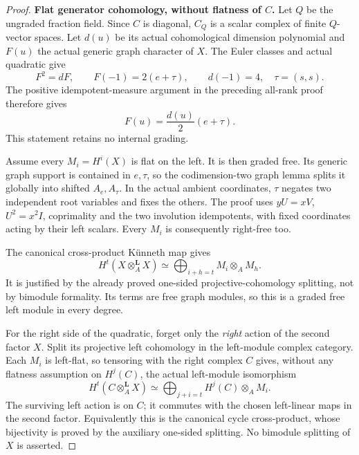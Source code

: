 \documentclass[11pt,a4paper]{article}
\theoremstyle{named}\newtheorem{finding}{Finding}[section]
\theoremstyle{definition}\newtheorem{definition}[finding]{Definition}
\theoremstyle{remark}\newtheorem{remark}[finding]{Remark}
\begin{document}
\begin{proof}
\par\smallskip\noindent\textbf{Flat generator cohomology, without flatness of \(C\).}\quad
Let \(Q\) be the ungraded fraction field.
Since \(C\) is diagonal, \(C_Q\) is a scalar
complex of finite \(Q\)-vector spaces.
Let \(d(u)\) be its actual cohomological
dimension polynomial and \(F(u)\) the actual
generic graph character of \(X\).
The Euler classes and actual quadratic give
\[
 F^2=dF,\qquad F(-1)=2(e+\tau),\qquad d(-1)=4,
                  \quad\tau=(s,s).
\]
The positive idempotent-measure argument in the
preceding all-rank proof therefore gives
\begin{equation}\label{eq:centralCoefficientGenericGraphs}
                      F(u)=\frac{d(u)}2(e+\tau).
\end{equation}
This statement retains no internal grading.

Assume every \(M_i=H^i(X)\) is flat on the left.
It is then graded free. Its generic graph support
is contained in \(e,\tau\), so the codimension-two
graph lemma splits it globally into shifted
\(A_e,A_\tau\). In the actual ambient coordinates,
\(\tau\) negates two independent root variables
and fixes the others. The proof uses
\(yU=xV\), \(U^2=x^2I\), coprimality and the
two involution idempotents, with fixed coordinates
acting by their left scalars.
Every \(M_i\) is consequently right-free too.

The canonical cross-product K\"unneth map gives
\begin{equation}\label{eq:centralCoefficientFreeSquare}
 H^t(X\otimes_A^{\mathbf L}X)
       \simeq\bigoplus_{i+h=t}M_i\otimes_A M_h.
\end{equation}
It is justified by the already proved one-sided
projective-cohomology splitting, not by bimodule
formality. Its terms are free graph modules, so
this is a graded free left module in every degree.

For the right side of the quadratic, forget only
the \emph{right} action of the second factor \(X\).
Split its projective left cohomology in the
left-module complex category. Each \(M_i\) is
left-flat, so tensoring with the right complex
\(C\) gives, without any flatness assumption
on \(H^j(C)\), the actual left-module isomorphism
\begin{equation}\label{eq:centralCoefficientNonflatKunneth}
 H^t(C\otimes_A^{\mathbf L}X)
       \simeq\bigoplus_{j+i=t}H^j(C)\otimes_A M_i.
\end{equation}
The surviving left action is on \(C\); it
commutes with the chosen left-linear maps in
the second factor. Equivalently this is the
canonical cycle cross-product, whose bijectivity
is proved by the auxiliary one-sided splitting.
No bimodule splitting of \(X\) is asserted.


\end{proof}
\end{document}
